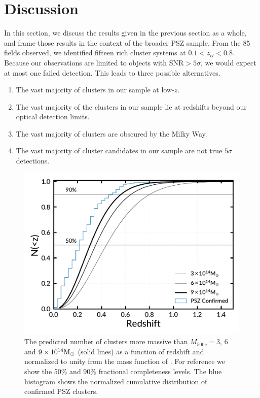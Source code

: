 \documentclass[apj, revtex4-1]{emulateapj}
\begin{document}
\section{Discussion}\label{sec:discussion}
In this section, we discuss the results given in the previous section as a whole, and frame those results in the context of the broader PSZ sample. From the 85 fields observed, we identified fifteen rich cluster systems at $0.1 < z_{cl} < 0.8$. Because our observations are limited to objects with SNR$>5\sigma$, we would expect at most one failed detection. This leads to three possible alternatives.

\begin{enumerate}
	\item The vast majority of clusters in our sample at low-$z$.
	\item The vast majority of the clusters in our sample lie at redshifts beyond our optical detection limits.
	\item The vast majority of clusters are obscured by the Milky Way.
	\item The vast majority of cluster candidates in our sample are not true $5\sigma$ detections.
\end{enumerate}

\begin{figure}
	\includegraphics[width=\columnwidth]{figures/cluster_forecast.pdf}
	\caption{The predicted number of clusters more massive than $M_{500c}=3$, 6 and $9 \times 10^{14}\hbox{$\mathrm{M}_\odot$}$ (solid lines) as a function of redshift and normalized to unity from the mass function of \cite{Tinker2008}. For reference we show the 50\% and 90\% fractional completeness levels. The blue histogram shows the normalized cumulative distribution of confirmed PSZ clusters.}
	\label{fig:cluster_forecast}
\end{figure}
\end{document}
